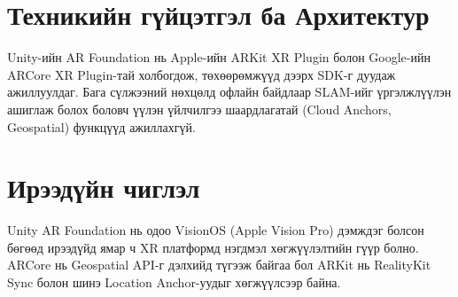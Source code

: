 \begin{sloppy}
\section*{Техникийн гүйцэтгэл ба Архитектур}
Unity-ийн AR Foundation нь Apple-ийн ARKit XR Plugin болон Google-ийн ARCore XR Plugin-тай холбогдож, төхөөрөмжүүд дээрх SDK-г дуудаж ажиллуулдаг. Бага сүлжээний нөхцөлд офлайн байдлаар SLAM-ийг үргэлжлүүлэн ашиглаж болох боловч үүлэн үйлчилгээ шаардлагатай (Cloud Anchors, Geospatial) функцүүд ажиллахгүй.

\section*{Ирээдүйн чиглэл}
Unity AR Foundation нь одоо VisionOS (Apple Vision Pro) дэмждэг болсон бөгөөд ирээдүйд ямар ч XR платформд нэгдмэл хөгжүүлэлтийн гүүр болно. ARCore нь Geospatial API-г дэлхийд түгээж байгаа бол ARKit нь RealityKit Sync болон шинэ Location Anchor-уудыг хөгжүүлсээр байна.

\end{sloppy}

